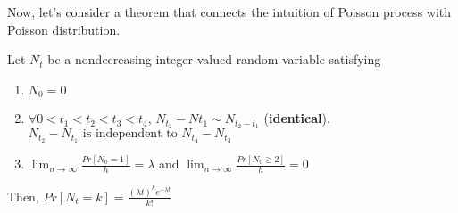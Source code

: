 \documentclass[11pt]{article}
\begin{document}
\noindent Now, let's consider a theorem that connects the intuition of Poisson process with Poisson distribution.
\begin{theorem}
	Let $N_t$ be a nondecreasing integer-valued random variable satisfying
	\begin{enumerate}
		\item $N_0=0$
		\item $\forall0<t_1<t_2<t_3<t_4$, $N_{t_2}-N{t_1}\sim N_{t_2-t_1}$ ({\bf identical}). $N_{t_2} - N_{t_1} \mbox{ is independent to } N_{t_4} - N_{t_3}$
		\item $\lim_{n\rightarrow\infty}\frac{Pr[N_0=1]}{h} = \lambda$ and $\lim_{n\rightarrow\infty}\frac{Pr[N_0\geq2]}{h}=0$
	\end{enumerate}
	Then, $Pr[N_t=k] = \frac{(\lambda t)^ke^{-\lambda t}}{k!}$
\end{theorem}
\end{document}
